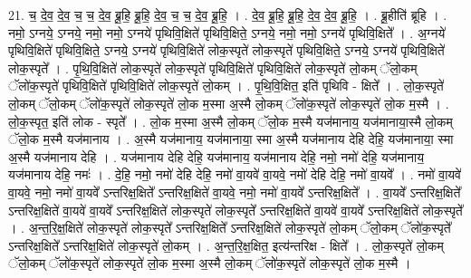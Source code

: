 \documentclass[17pt]{extarticle}
\begin{document}
21. च॒ दे॒व॒ दे॒व॒ च॒ च॒ दे॒व॒ ब्रू॒हि॒ ब्रू॒हि॒ दे॒व॒ च॒ च॒ दे॒व॒ ब्रू॒हि॒ । . दे॒व॒ ब्रू॒हि॒ ब्रू॒हि॒ दे॒व॒ दे॒व॒ ब्रू॒हि॒ । . ब्रू॒हीति॑ ब्रूहि । . नमो॒ ऽग्नये॒ ऽग्नये॒ नमो॒ नमो॒ ऽग्नये॑ पृथिवि॒क्षिते॑ पृथिवि॒क्षिते॒ ऽग्नये॒ नमो॒ नमो॒ ऽग्नये॑ पृथिवि॒क्षिते᳚ । . अ॒ग्नये॑ पृथिवि॒क्षिते॑ पृथिवि॒क्षिते॒ ऽग्नये॒ ऽग्नये॑ पृथिवि॒क्षिते॑ लोक॒स्पृते॑ लोक॒स्पृते॑ पृथिवि॒क्षिते॒ ऽग्नये॒ ऽग्नये॑ पृथिवि॒क्षिते॑ लोक॒स्पृते᳚ । . पृ॒थि॒वि॒क्षिते॑ लोक॒स्पृते॑ लोक॒स्पृते॑ पृथिवि॒क्षिते॑ पृथिवि॒क्षिते॑ लोक॒स्पृते॑ लो॒कम् ॅलो॒कम् ॅलो॑क॒स्पृते॑ पृथिवि॒क्षिते॑ पृथिवि॒क्षिते॑ लोक॒स्पृते॑ लो॒कम् । . पृ॒थि॒वि॒क्षित॒ इति॑ पृथिवि - क्षिते᳚ । . लो॒क॒स्पृते॑ लो॒कम् ॅलो॒कम् ॅलो॑क॒स्पृते॑ लोक॒स्पृते॑ लो॒क म॒स्मा अ॒स्मै लो॒कम् ॅलो॑क॒स्पृते॑ लोक॒स्पृते॑ लो॒क म॒स्मै । . लो॒क॒स्पृत॒ इति॑ लोक - स्पृते᳚ । . लो॒क म॒स्मा अ॒स्मै लो॒कम् ॅलो॒क म॒स्मै यज॑मानाय॒ यज॑मानाया॒स्मै लो॒कम् ॅलो॒क म॒स्मै यज॑मानाय । . अ॒स्मै यज॑मानाय॒ यज॑मानाया॒ स्मा अ॒स्मै यज॑मानाय देहि देहि॒ यज॑मानाया॒ स्मा अ॒स्मै यज॑मानाय देहि । . यज॑मानाय देहि देहि॒ यज॑मानाय॒ यज॑मानाय देहि॒ नमो॒ नमो॑ देहि॒ यज॑मानाय॒ यज॑मानाय देहि॒ नमः॑ । . दे॒हि॒ नमो॒ नमो॑ देहि देहि॒ नमो॑ वा॒यवे॑ वा॒यवे॒ नमो॑ देहि देहि॒ नमो॑ वा॒यवे᳚ । . नमो॑ वा॒यवे॑ वा॒यवे॒ नमो॒ नमो॑ वा॒यवे᳚ ऽन्तरिक्ष॒क्षिते᳚ ऽन्तरिक्ष॒क्षिते॑ वा॒यवे॒ नमो॒ नमो॑ वा॒यवे᳚ ऽन्तरिक्ष॒क्षिते᳚ । . वा॒यवे᳚ ऽन्तरिक्ष॒क्षिते᳚ ऽन्तरिक्ष॒क्षिते॑ वा॒यवे॑ वा॒यवे᳚ ऽन्तरिक्ष॒क्षिते॑ लोक॒स्पृते॑ लोक॒स्पृते᳚ ऽन्तरिक्ष॒क्षिते॑ वा॒यवे॑ वा॒यवे᳚ ऽन्तरिक्ष॒क्षिते॑ लोक॒स्पृते᳚ । . अ॒न्त॒रि॒क्ष॒क्षिते॑ लोक॒स्पृते॑ लोक॒स्पृते᳚ ऽन्तरिक्ष॒क्षिते᳚ ऽन्तरिक्ष॒क्षिते॑ लोक॒स्पृते॑ लो॒कम् ॅलो॒कम् ॅलो॑क॒स्पृते᳚ ऽन्तरिक्ष॒क्षिते᳚ ऽन्तरिक्ष॒क्षिते॑ लोक॒स्पृते॑ लो॒कम् । . अ॒न्त॒रि॒क्ष॒क्षित॒ इत्य॑न्तरिक्ष - क्षिते᳚ । . लो॒क॒स्पृते॑ लो॒कम् ॅलो॒कम् ॅलो॑क॒स्पृते॑ लोक॒स्पृते॑ लो॒क म॒स्मा अ॒स्मै लो॒कम् ॅलो॑क॒स्पृते॑ लोक॒स्पृते॑ लो॒क म॒स्मै । \newline
\end{document}
